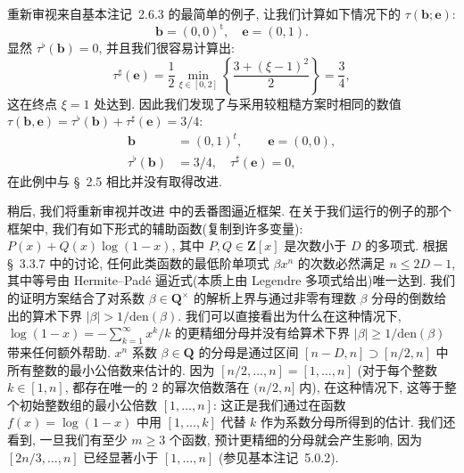 \begin{remark}[基本注记 6.0.17]\label{rem:6.0.17}
重新审视来自基本注记~2.6.3 的最简单的例子, 让我们计算如下情况下的 $\tau(\mathbf{b}; \mathbf{e})$:
\[ \mathbf{b} = (0,0)^{\mathrm{t}}, \quad \mathbf{e} = (0,1). \]
显然 $\tau^{\flat}(\mathbf{b}) = 0$, 并且我们很容易计算出:
\[ \tau^{\sharp}(\mathbf{e}) = \frac{1}{2} \min_{\xi \in [0,2]} \left\{ \frac{3 + (\xi - 1)^2}{2} \right\} = \frac{3}{4}, \]
这在终点 $\xi = 1$ 处达到.
因此我们发现了与采用较粗糙方案时相同的数值 $\tau(\mathbf{b}, \mathbf{e}) = \tau^{\flat}(\mathbf{b}) + \tau^{\sharp}(\mathbf{e}) = 3/4$:
\[
\begin{aligned}
\mathbf{b} &= (0, 1)^t, \qquad \mathbf{e} = (0, 0), \\
\tau^{\flat}(\mathbf{b}) &= 3/4, \quad \tau^{\sharp}(\mathbf{e}) = 0,
\end{aligned}
\]
在此例中与 \S~2.5 相比并没有取得改进.

稍后, 我们将重新审视并改进 \cite[§ 2.1]{CDT21} 中的丢番图逼近框架.
在关于我们运行的例子的那个框架中, 我们有如下形式的辅助函数(复制到许多变量): $P(x) + Q(x) \log(1-x)$, 其中 $P, Q \in \mathbf{Z}[x]$ 是次数小于 $D$ 的多项式.
根据 \S~3.3.7 中的讨论, 任何此类函数的最低阶单项式 $\beta x^n$ 的次数必然满足 $n \le 2D - 1$, 其中等号由 Hermite--Pad{\'e} 逼近式(本质上由 Legendre 多项式给出)唯一达到.
我们的证明方案结合了对系数 $\beta \in \mathbf{Q}^{\times}$ 的解析上界与通过非零有理数 $\beta$ 分母的倒数给出的算术下界 $|\beta| > 1/\text{den}(\beta)$.
我们可以直接看出为什么在这种情况下, $\log(1-x) = -\sum_{k=1}^{\infty} x^k/k$ 的更精细分母并没有给算术下界 $|\beta| \ge 1/\text{den}(\beta)$ 带来任何额外帮助.
$x^n$ 系数 $\beta \in \mathbf{Q}$ 的分母是通过区间 $[n-D, n] \supset [n/2, n]$ 中所有整数的最小公倍数来估计的.
因为 $[n/2, \dots, n] = [1, \dots, n]$ (对于每个整数 $k \in [1, n]$, 都存在唯一的 $2$ 的幂次倍数落在 $(n/2, n]$ 内), 在这种情况下, 这等于整个初始整数组的最小公倍数 $[1, \dots, n]$: 这正是我们通过在函数 $f(x) = \log(1-x)$ 中用 $[1, \dots, k]$ 代替 $k$ 作为系数分母所得到的估计.
我们还看到, 一旦我们有至少 $m \ge 3$ 个函数, 预计更精细的分母就会产生影响, 因为 $[2n/3, \dots, n]$ 已经显著小于 $[1, \dots, n]$ (参见基本注记~5.0.2). \end{remark}

